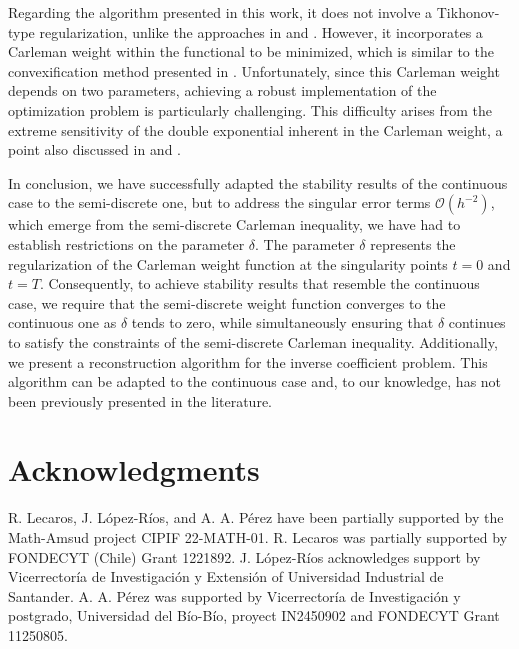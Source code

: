 \documentclass{amsart}
\numberwithin{equation}{section}
\begin{document}
    Regarding the algorithm presented in this work, it does not involve a Tikhonov-type regularization, unlike the approaches in \cite{YZ:2001} and \cite{KJZ:2020}. However, it incorporates a Carleman weight within the functional to be minimized, which is similar to the convexification method presented in \cite{KJZ:2020}. Unfortunately, since this Carleman weight depends on two parameters, achieving a robust implementation of the optimization problem is particularly challenging. This difficulty arises from the extreme sensitivity of the double exponential inherent in the Carleman weight, a point also discussed in \cite{KJZ:2020} and \cite{BE:2013}.
    
    
    In conclusion, we have successfully adapted the stability results of the continuous case to the semi-discrete one, but to address the singular error terms $\mathcal{O}(h^{-2})$, which emerge from the semi-discrete Carleman inequality, we have had to establish restrictions on the parameter $\delta$. The parameter $\delta$ represents the regularization of the Carleman weight function at the singularity points $t=0$ and $t=T$. Consequently, to achieve stability results that resemble the continuous case, we require that the semi-discrete weight function converges to the continuous one as $\delta$ tends to zero, while simultaneously ensuring that $\delta$ continues to satisfy the constraints of the semi-discrete Carleman inequality. Additionally, we present a reconstruction algorithm for the inverse coefficient problem. This algorithm can be adapted to the continuous case and, to our knowledge, has not been previously presented in the literature.
    
    
    
\section*{Acknowledgments}
R. Lecaros, J. L\'opez-R\'ios, and A. A. P\'erez have been partially supported by the Math-Amsud project	CIPIF 22-MATH-01. R. Lecaros was partially supported by FONDECYT (Chile) Grant 1221892. J. L\'opez-R\'ios acknowledges support by Vicerrectoría de Investigación y Extensión of Universidad Industrial de Santander.  A. A. P\'erez was supported by Vicerrector\'ia de Investigaci\'on y postgrado, Universidad del B\'io-B\'io, proyect IN2450902 and FONDECYT Grant 11250805.



\end{document}
